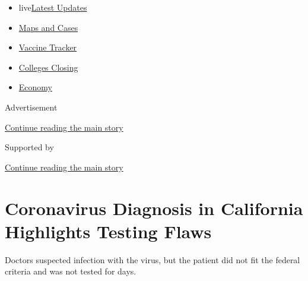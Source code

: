 \begin{itemize}
\tightlist
\item
  live\href{https://www.nytimes3xbfgragh.onion/2020/08/21/world/covid-19-coronavirus.html?name=styln-coronavirus-national\&region=TOP_BANNER\&variant=undefined\&block=storyline_menu_recirc\&action=click\&pgtype=Article\&impression_id=d1643a10-e3af-11ea-a964-3f8cb8589728}{Latest
  Updates}
\item
  \href{https://www.nytimes3xbfgragh.onion/interactive/2020/us/coronavirus-us-cases.html?name=styln-coronavirus-national\&region=TOP_BANNER\&variant=undefined\&block=storyline_menu_recirc\&action=click\&pgtype=Article\&impression_id=d1643a11-e3af-11ea-a964-3f8cb8589728}{Maps
  and Cases}
\item
  \href{https://www.nytimes3xbfgragh.onion/interactive/2020/science/coronavirus-vaccine-tracker.html?name=styln-coronavirus-national\&region=TOP_BANNER\&variant=undefined\&block=storyline_menu_recirc\&action=click\&pgtype=Article\&impression_id=d1643a12-e3af-11ea-a964-3f8cb8589728}{Vaccine
  Tracker}
\item
  \href{https://www.nytimes3xbfgragh.onion/2020/08/19/us/colleges-closing-covid.html?name=styln-coronavirus-national\&region=TOP_BANNER\&variant=undefined\&block=storyline_menu_recirc\&action=click\&pgtype=Article\&impression_id=d1643a13-e3af-11ea-a964-3f8cb8589728}{Colleges
  Closing}
\item
  \href{https://www.nytimes3xbfgragh.onion/live/2020/08/21/business/stock-market-today-coronavirus?name=styln-coronavirus-national\&region=TOP_BANNER\&variant=undefined\&block=storyline_menu_recirc\&action=click\&pgtype=Article\&impression_id=d1643a14-e3af-11ea-a964-3f8cb8589728}{Economy}
\end{itemize}

Advertisement

\protect\hyperlink{after-top}{Continue reading the main story}

Supported by

\protect\hyperlink{after-sponsor}{Continue reading the main story}

\hypertarget{coronavirus-diagnosis-in-california-highlights-testing-flaws}{%
\section{Coronavirus Diagnosis in California Highlights Testing
Flaws}\label{coronavirus-diagnosis-in-california-highlights-testing-flaws}}

Doctors suspected infection with the virus, but the patient did not fit
the federal criteria and was not tested for days.

